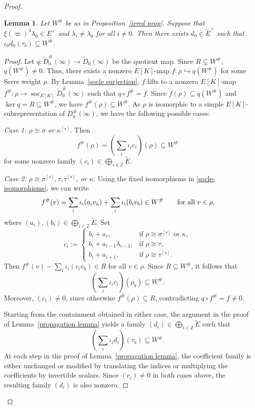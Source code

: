 \documentclass[a4paper,10pt,twoside]{amsart}
\newtheorem{lemma}[theorem]{Lemma}
\theoremstyle{definition}
\numberwithin{equation}{section}
\begin{document}
\begin{proof}
\begin{lemma}\label{nonzero hom}
Let \(W^\#\) be as in Proposition~\ref{irred prop}. Suppose that $\xi(\varpi)^4\lambda_0 \in E^\times$ and $\lambda_i \neq \lambda_0$ for all $i \neq 0$. Then there exists \(d_0\in\widetilde E^\times\) such that $\iota_0d_0(\tau_b)\subseteq W^\#$.
\end{lemma}

\begin{proof}
Let $q:\widetilde D_0^\#(\infty)\rightarrow \widetilde D_0(\infty)$ be the quotient map. Since \(R\subsetneq W^\#\), $q(W^\#)\neq 0$. Thus, there exists a nonzero \(E[K]\)-map \(f:\rho\hookrightarrow q(W^\#)\) for some Serre weight
\(\rho\). By Lemma~\ref{socle surjection}, \(f\) lifts to a nonzero \(E[K]\)-map $f^\#:\rho\rightarrow
\operatorname{soc}_{E[K]}\widetilde D_0^\#(\infty)$ such that \(q\circ f^\#=f\). Since \(f(\rho)\subseteq q(W^\#)\) and \(\ker q=R\subseteq W^\#\),
we have \(f^\#(\rho)\subseteq W^\#\). As $\rho$ is isomorphic to a simple $E[K]$-subrepresentation of $D_0^\#(\infty)$, we have the following possible cases:

\medskip
\noindent
\emph{Case 1: \(\rho\cong\sigma\) or \(\kappa^{[s]}\).} Then
\[
f^\#(\rho)=
\left(\sum_i\iota_i c_i\right)(\rho)\subseteq W^\#
\]
for some nonzero family
\((c_i)\in\bigoplus_{i\in\mathbb Z}\widetilde E\).

\medskip
\noindent
\emph{Case 2: \(\rho\cong\sigma^{[s]},\tau,\tau^{[s]}\),
or \(\kappa\).}
Using the fixed isomorphisms in \eqref{socle-isomorphisms}, we can write
\[
f^\#(v)=
\sum_i\iota_i(a_i v_a)+
\sum_i\iota_i(b_i v_b)\in W^\#
\qquad\textup{for all } v\in\rho,
\]
where
\((a_i),(b_i)\in\bigoplus_{i\in\mathbb Z}\widetilde E\).
Set
\[
c_i:=
\begin{cases}
b_i+a_i,
  &\text{if }\rho\cong\sigma^{[s]}\text{ or }\kappa,\\
b_i+a_{i-1}\lambda_{i-1},
  &\text{if }\rho\cong\tau,\\
b_i+a_{i+1},
  &\text{if }\rho\cong\tau^{[s]}.
\end{cases}
\]
Then $f^\#(v)-\sum_i\iota_i(c_i v_b)\in R$ for all $v\in\rho$. Since \(R\subseteq W^\#\), it follows that
\[
\left(\sum_i\iota_i c_i\right)(\rho_b)\subseteq W^\#.
\]
Moreover, \((c_i)\neq0\), since otherwise
\(f^\#(\rho)\subseteq R\), contradicting
\(q\circ f^\#=f\neq0\).

\medskip
Starting from the containment obtained in either case,
the argument in the proof of
Lemma~\ref{propagation lemma} yields a family
\((d_i)\in\bigoplus_{i\in\mathbb Z}\widetilde E\)
such that
\begin{equation}\label{di}
\left(\sum_i\iota_i d_i\right)(\tau_b)\subseteq W^\#.
\end{equation}
At each step in the proof of Lemma~\ref{propagation lemma}, the coefficient family is either unchanged or modified by translating the indices or multiplying the coefficients by invertible scalars. Since \((c_i)\neq0\) in both cases above, the resulting family \((d_i)\) is also nonzero.


\end{proof}
\end{proof}
\end{document}
